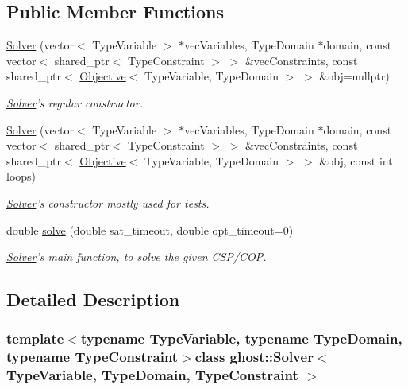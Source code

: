 \subsection*{Public Member Functions}
\begin{DoxyCompactItemize}
\item 
\hyperlink{classghost_1_1Solver_aee74bbdf00494dc209d4909bf9fcb544}{Solver} (vector$<$ Type\-Variable $>$ $\ast$vec\-Variables, Type\-Domain $\ast$domain, const vector$<$ shared\-\_\-ptr$<$ Type\-Constraint $>$ $>$ \&vec\-Constraints, const shared\-\_\-ptr$<$ \hyperlink{classghost_1_1Objective}{Objective}$<$ Type\-Variable, Type\-Domain $>$ $>$ \&obj=nullptr)
\begin{DoxyCompactList}\small\item\em \hyperlink{classghost_1_1Solver}{Solver}'s regular constructor. \end{DoxyCompactList}\item 
\hyperlink{classghost_1_1Solver_a512335329b22a91700bdfa7870f053e9}{Solver} (vector$<$ Type\-Variable $>$ $\ast$vec\-Variables, Type\-Domain $\ast$domain, const vector$<$ shared\-\_\-ptr$<$ Type\-Constraint $>$ $>$ \&vec\-Constraints, const shared\-\_\-ptr$<$ \hyperlink{classghost_1_1Objective}{Objective}$<$ Type\-Variable, Type\-Domain $>$ $>$ \&obj, const int loops)
\begin{DoxyCompactList}\small\item\em \hyperlink{classghost_1_1Solver}{Solver}'s constructor mostly used for tests. \end{DoxyCompactList}\item 
double \hyperlink{classghost_1_1Solver_a5d15e316f5a4bb8a33c6781058ad0307}{solve} (double sat\-\_\-timeout, double opt\-\_\-timeout=0)
\begin{DoxyCompactList}\small\item\em \hyperlink{classghost_1_1Solver}{Solver}'s main function, to solve the given C\-S\-P/\-C\-O\-P. \end{DoxyCompactList}\end{DoxyCompactItemize}


\subsection{Detailed Description}
\subsubsection*{template$<$typename Type\-Variable, typename Type\-Domain, typename Type\-Constraint$>$class ghost\-::\-Solver$<$ Type\-Variable, Type\-Domain, Type\-Constraint $>$}


